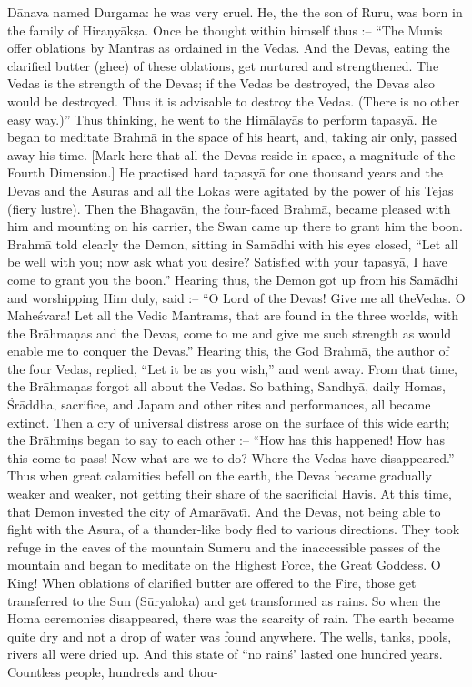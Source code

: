 D\=anava named Durgama: he was very cruel. He, the the son of Ruru, was born in the family of Hira\d{n}y\=ak\d{s}a. Once be thought within himself thus :-- ``The Munis offer oblations by Mantras as ordained in the Vedas. And the Devas, eating the clarified butter (ghee) of these oblations, get
nurtured and strengthened. The Vedas is the strength of the Devas; if the Vedas be destroyed, the Devas also would be destroyed. Thus it is advisable to destroy the Vedas. (There is no other easy way.)'' Thus thinking, he went to the Him\=alay\=as to perform tapasy\=a. He began to meditate Brahm\=a in the space of his heart, and, taking air only, passed away his time. [Mark here that all the Devas reside in space, a magnitude of the Fourth Dimension.] He practised hard tapasy\=a for one thousand years and the Devas and the Asuras and all the Lokas were agitated by the power of his Tejas (fiery lustre). Then the Bhagav\=an, the four-faced Brahm\=a, became pleased with him and mounting on his carrier, the Swan came up there to grant him the boon. Brahm\=a told clearly the Demon, sitting in Sam\=adhi with his eyes closed, ``Let all be well with you; now ask what you desire? Satisfied with your tapasy\=a, I have come to grant you the boon.'' Hearing thus, the Demon got up from his Sam\=adhi and worshipping Him duly, said :-- ``O Lord of the Devas! Give me all theVedas. O Mahe\'svara! Let all the Vedic Mantrams, that are found in the three worlds, with the Br\=ahma\d{n}as and the Devas, come to me and give me such strength as would enable me to conquer the Devas.'' Hearing this, the God Brahm\=a, the author of the four Vedas, replied, ``Let it be as you wish,'' and went away. From that time, the Br\=ahma\d{n}as forgot all about the Vedas. So bathing, Sandhy\=a, daily Homas, \'Sr\=addha, sacrifice, and Japam and other rites and performances, all became extinct. Then a cry of universal distress arose on the surface of this wide earth; the Br\=ahmi\d{n}s began to say to each other :-- ``How has this happened! How has this come to pass! Now what are we to do? Where the Vedas have disappeared.'' Thus when great calamities befell on the earth, the Devas became gradually weaker and weaker, not getting their share of the sacrificial Havis. At this time, that Demon invested the city of Amar\=avat\={\i}. And the Devas, not being able to fight with the Asura, of a thunder-like body fled to various directions. They took refuge in the caves of the mountain Sumeru and the inaccessible passes of the mountain and began to meditate on the Highest Force, the Great Goddess. O King! When oblations of clarified butter are offered to the Fire, those get transferred to the Sun (S\=uryaloka) and get transformed as rains. So when the Homa ceremonies disappeared, there was the scarcity of rain. The earth became quite dry and not a drop of water was found anywhere. The wells, tanks, pools, rivers all were dried up. And this state of ``no rain\'s' lasted one hundred years. Countless people, hundreds and thou-

